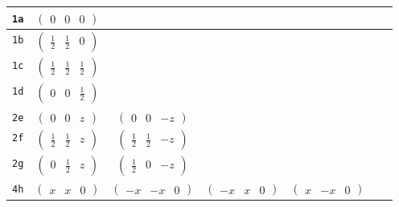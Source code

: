 \documentclass[fleqn,9pt,landscape]{jsarticle}
\begin{document}
\begin{center}
\begin{longtable}{ccccccc}
{\tt 1a} & $ \begin{pmatrix} 0 & 0 & 0 \end{pmatrix} $ & $  $ & $  $ & $  $ & $  $ & $  $ \\ \hline
{\tt 1b} & $ \begin{pmatrix} \frac{1}{2} & \frac{1}{2} & 0 \end{pmatrix} $ & $  $ & $  $ & $  $ & $  $ & $  $ \\ \hline
{\tt 1c} & $ \begin{pmatrix} \frac{1}{2} & \frac{1}{2} & \frac{1}{2} \end{pmatrix} $ & $  $ & $  $ & $  $ & $  $ & $  $ \\ \hline
{\tt 1d} & $ \begin{pmatrix} 0 & 0 & \frac{1}{2} \end{pmatrix} $ & $  $ & $  $ & $  $ & $  $ & $  $ \\ \hline
{\tt 2e} & $ \begin{pmatrix} 0 & 0 & z \end{pmatrix} $ & $ \begin{pmatrix} 0 & 0 & - z \end{pmatrix} $ & $  $ & $  $ & $  $ & $  $ \\ \hline
{\tt 2f} & $ \begin{pmatrix} \frac{1}{2} & \frac{1}{2} & z \end{pmatrix} $ & $ \begin{pmatrix} \frac{1}{2} & \frac{1}{2} & - z \end{pmatrix} $ & $  $ & $  $ & $  $ & $  $ \\ \hline
{\tt 2g} & $ \begin{pmatrix} 0 & \frac{1}{2} & z \end{pmatrix} $ & $ \begin{pmatrix} \frac{1}{2} & 0 & - z \end{pmatrix} $ & $  $ & $  $ & $  $ & $  $ \\ \hline
{\tt 4h} & $ \begin{pmatrix} x & x & 0 \end{pmatrix} $ & $ \begin{pmatrix} - x & - x & 0 \end{pmatrix} $ & $ \begin{pmatrix} - x & x & 0 \end{pmatrix} $ & $ \begin{pmatrix} x & - x & 0 \end{pmatrix} $ & $  $ & $  $ \\ \hline

\end{longtable}
\end{center}
\end{document}
